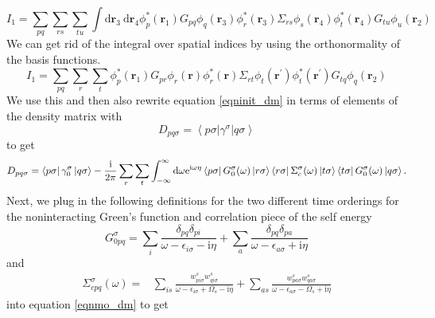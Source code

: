\documentclass[12pt]{caltech_thesis}
\begin{document}
\begin{equation}
I_1 = \sum_{pq} \sum_{rs} \sum_{tu} \int \mathrm{d} \mathbf{r}_3 \mathrm{~d} \mathbf{r}_4 \phi_p^*(\mathbf{r}_1) G_{p q} \phi_q(\mathbf{r}_3) \phi_r^*(\mathbf{r}_3) \Sigma_{r s} \phi_s(\mathbf{r}_4) \phi_t^*(\mathbf{r}_4) G_{t u} \phi_u(\mathbf{r}_2)
\end{equation}
We can get rid of the integral over spatial indices by using the orthonormality of the basis functions.
\begin{equation}
I_1 = \sum_{pq} \sum_{r} \sum_{t} \phi_p^*(\mathbf{r}_1) G_{p r} \phi_r(\mathbf{r}) \phi_r^*(\mathbf{r}) \Sigma_{r t} \phi_t(\mathbf{r}^\prime) \phi_t^*(\mathbf{r}^\prime) G_{t q} \phi_q(\mathbf{r}_2)
\end{equation}
We use this and then also rewrite equation \ref{eqninit_dm} in terms of elements of the density matrix with
\begin{equation}
D_{p q \sigma}=\left\langle p \sigma\left|\gamma^\sigma\right| q \sigma\right\rangle
\end{equation}
to get
\begin{equation}
    D_{p q \sigma}=\bra{p\sigma } \gamma _0^\sigma \ket{q\sigma } -\frac{\mathrm{i }}{2 \pi} \sum_{r} \sum_{t} \int_{-\infty }^{\infty } \mathrm{d} \omega \mathrm{e}^{\mathrm{i \omega \eta}} \bra{p\sigma } G_0^\sigma (\omega) \ket{r\sigma } \bra{r\sigma } \Sigma_c^\sigma (\omega) \ket{t\sigma } \bra{t\sigma } G_0^\sigma (\omega) \ket{q\sigma }.
\label{eqnmo_dm}
\end{equation}
Next, we plug in the following definitions for the two different time orderings for the noninteracting Green's function and correlation piece of the self energy
\begin{equation}
G_{0 pq}^\sigma=\sum_i \frac{\delta_{pq} \delta_{pi}}{\omega-\epsilon_{i\sigma}-\mathrm{i}\eta}+\sum_a \frac{\delta_{pq} \delta_{pa}}{\omega-\epsilon_{a\sigma}+\mathrm{i}\eta}
\end{equation}
and
\begin{equation}
\begin{aligned}
\Sigma_{c p q}^\sigma(\omega)= & \sum_{i s} \frac{w_{p i \sigma}^s w_{q i \sigma}^s}{\omega-\epsilon_{i \sigma}+\Omega_s-\mathrm{i} \eta} +\sum_{a s} \frac{w_{p a \sigma}^s w_{q a \sigma}^s}{\omega-\epsilon_{a \sigma}-\Omega_s+\mathrm{i} \eta}
\end{aligned}
\end{equation}
into equation \ref{eqnmo_dm} to get
\end{document}
